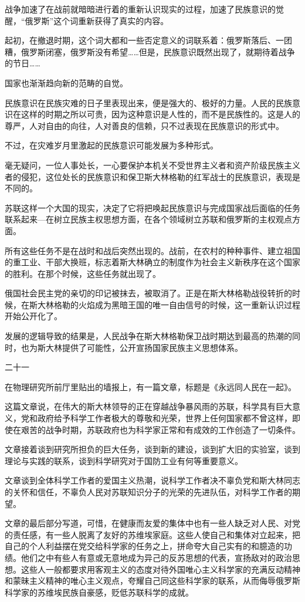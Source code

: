 战争加速了在战前就暗暗进行着的重新认识现实的过程，加速了民族意识的觉醒，“俄罗斯”这个词重新获得了真实的内容。

起初，在撤退时期，这个词大都和一些否定意义的词联系着：俄罗斯落后、一团糟，俄罗斯闭塞，俄罗斯没有希望……但是，民族意识既然出现了，就期待着战争的节日……

国家也渐渐趋向新的范畴的自觉。

民族意识在民族灾难的日子里表现出来，便是强大的、极好的力量。人民的民族意识在这样的时期之所以可贵，因为这种意识是人性的，而不是民族性的。这是人的尊严，人对自由的向往，人对善良的信赖，只不过表现在民族意识的形式中。

不过，在灾难岁月里激起的民族意识可能发展为多种形式。

毫无疑问，一位人事处长，一心要保护本机关不受世界主义者和资产阶级民族主义者的侵犯，这位处长的民族意识和保卫斯大林格勒的红军战士的民族意识，表现是不同的。

苏联这样一个大国的现实，决定了它将把唤起民族意识与完成国家战后面临的任务联系起来—在树立民族主权思想方面，在各个领域树立苏联和俄罗斯的主权观点方面。

所有这些任务不是在战时和战后突然出现的。战前，在农村的种种事件、建立祖国的重工业、干部大换班，标志着斯大林确立的制度作为社会主义新秩序在这个国家的胜利。在那个时候，这些任务就出现了。

俄国社会民主党的亲切的印记被抹去，被取消了。正是在斯大林格勒战役转折的时候，在斯大林格勒的火焰成为黑暗王国的唯一自由信号的时候，这一重新认识过程开始公开化了。

发展的逻辑导致的结果是，人民战争在斯大林格勒保卫战时期达到最高的热潮的同时，也为斯大林提供了可能性，公开宣扬国家民族主义思想体系。

二十一

在物理研究所前厅里贴出的墙报上，有一篇文章，标题是《永远同人民在一起》。

这篇文章说，在伟大的斯大林领导的正在穿越战争暴风雨的苏联，科学具有巨大意义，党和政府给予科学工作者极大的尊敬和光荣，世界上任何国家都不曾这样，即使在艰苦的战争时期，苏联政府也为科学家正常和有成效的工作创造了一切条件。

文章接着谈到研究所担负的巨大任务，谈到新的建设，谈到扩大旧的实验室，谈到理论与实践的联系，谈到科学研究对于国防工业有何等重要意义。

文章谈到全体科学工作者的爱国主义热潮，说科学工作者决不辜负党和斯大林同志的关怀和信任，不辜负人民对苏联知识分子的光荣的先进队伍，对科学工作者的期望。

文章的最后部分写道，可惜，在健康而友爱的集体中也有一些人缺乏对人民、对党的责任感，有一些人脱离了友好的苏维埃家庭。这些人使自己和集体对立起来，把自己的个人利益摆在党交给科学家的任务之上，拼命夸大自己实有的和臆造的功绩。他们之中有些人有意或无意地成为异己的反苏思想的代表，宣扬敌对的政治思想。这些人一般都要求用客观主义的态度对待外国唯心主义科学家的充满反动精神和蒙昧主义精神的唯心主义观点，夸耀自己同这些科学家的联系，从而侮辱俄罗斯科学家的苏维埃民族自豪感，贬低苏联科学的成就。


